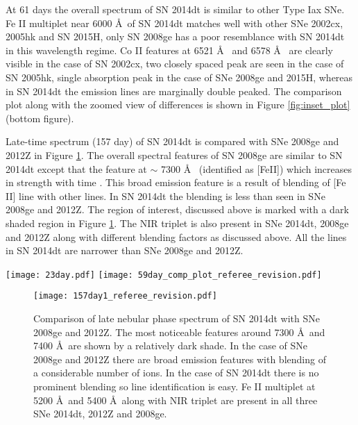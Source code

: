 \documentclass[fleqn,usenatbib]{mnras}
\begin{document}
At 61 days the overall spectrum of SN 2014dt is similar to other Type Iax SNe. Fe II multiplet near 6000 \AA~of SN 2014dt matches well with other SNe 2002cx, 2005hk and SN 2015H, only SN 2008ge has a poor resemblance with SN 2014dt in this wavelength regime. Co II features at 6521 \AA~ and 6578 \AA~ are clearly visible in the case of SN 2002cx, two closely spaced peak are seen in the case of SN 2005hk, single absorption peak in the case of SNe 2008ge and 2015H, whereas in SN 2014dt the emission lines are marginally double peaked. The comparison plot along with the zoomed view of differences is shown in Figure \ref{fig:inset_plot} (bottom figure).

Late-time spectrum (157 day) of SN 2014dt is compared with SNe 2008ge and 2012Z in Figure \ref{fig:157day_plot}. The overall spectral features of SN 2008ge are similar to SN 2014dt except that the feature at $\sim$ 7300 \AA~ (identified as [FeII]) which increases in strength with time \citep{2010AJ....140.1321F}. This broad emission feature is a result of blending of [Fe II] line with other lines. In SN 2014dt the blending is less than seen in SNe 2008ge and 2012Z. The region of interest, discussed above is marked with a dark shaded region in Figure \ref{fig:157day_plot}. The NIR triplet is also present in SNe 2014dt, 2008ge and 2012Z along with different blending factors as discussed above. All the lines in SN 2014dt are narrower than SNe 2008ge and 2012Z.   
 
\begin{figure*}
	\begin{center}
		\texttt{[image: 23day.pdf]} 
		\texttt{[image: 59day\_comp\_plot\_referee\_revision.pdf]} 
		
	\end{center}
	\caption{A comparison of SN 2014dt spectra at different epochs with other well studied Type Iax SNe. All spectra have been shifted on a relative scale and shifted vertically for clarity. {\bf Top figure:} A comparison of SN 2014dt at phase 23 days is shown. {\bf Bottom figure:} At 61 days there is overall a similarity exists between all the SNe except some line forming regions shown by dark shade. Also demarcating features are presented in a zoomed view in Figure. A full description of the observed features has been given under section 6.}
	\label{fig:inset_plot}
\end{figure*}   

\begin{figure} 
	\begin{center}
		\texttt{[image: 157day1\_referee\_revision.pdf]}
	\end{center}
	\caption{Comparison of late nebular phase spectrum of SN 2014dt with SNe 2008ge and 2012Z. The most noticeable features around 7300 \AA~and 7400 \AA~are shown by a relatively dark shade. In the case of SNe 2008ge and 2012Z there are broad emission features with blending of a considerable number of ions. In the case of SN 2014dt there is no prominent blending so line identification is easy. Fe II multiplet at 5200 \AA~and 5400 \AA~along with NIR triplet are present in all three SNe 2014dt, 2012Z and 2008ge.}
	\label{fig:157day_plot}
\end{figure}
\end{document}
